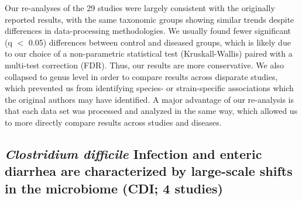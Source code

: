 \documentclass{article}
\begin{document}
{Our re-analyses of the 29 studies were largely consistent with the originally reported results, with the same taxonomic groups showing similar trends despite differences in data-processing methodologies. 
We usually found fewer significant (q $<$ 0.05) differences between control and diseased groups, which is likely due to our choice of a non-parametric statistical test (Kruskall-Wallis) paired with a multi-test correction (FDR). 
Thus, our results are more conservative.  
We also collapsed to genus level in order to compare results across disparate studies, which prevented us from identifying species- or strain-specific associations which the original authors may have identified. 
A major advantage of our re-analysis is that each data set was processed and analyzed in the same way, which allowed us to more directly compare results across studies and diseases.

\subsection*{\textit{Clostridium difficile} Infection and enteric diarrhea are characterized by large-scale shifts in the microbiome (CDI; 4 studies)}

}
\end{document}
